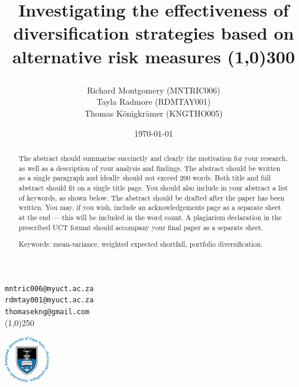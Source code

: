 \documentclass[12pt,a4paper]{article}
\begin{document}
\begin{titlepage}

\title{Investigating the effectiveness of diversification strategies based on alternative risk measures
\line(1,0){300}
\author{Richard Montgomery (MNTRIC006)\\
Tayla Radmore (RDMTAY001)\\
Thomas K{\"o}nigkr{\"a}mer (KNGTHO005)}}
\date{\today}
\maketitle
\begin{center}
{\tt mntric006@myuct.ac.za}\\
{\tt rdmtay001@myuct.ac.za}\\
{\tt thomasekng@gmail.com}\\
\hfill \break
\line(1,0){250}\\
\end{center}

\begin{center}
\includegraphics[width=2.0cm]{UCTlogo.jpg}
\end{center}

\begin{abstract}
The abstract should summarise succinctly and clearly the motivation for your research, as well as a description of your analysis and findings. 
The abstract should be written as a single paragraph and ideally should not exceed 200 words. 
Both title and full abstract should fit on a single title page. 
You should also include in  your abstract a list of keywords, as shown below. 
The abstract should be drafted after the paper has been written. 
You may, if you wish, include an acknowledgements page as a separate sheet at the end --- this will be included in the word count. 
A plagiarism declaration in the prescribed UCT format should accompany your final paper as a separate sheet.

\noindent
Keywords: mean-variance, weighted expected shortfall, portfolio diversification.
\end{abstract}

\thispagestyle{empty} %

\end{titlepage}
\end{document}
